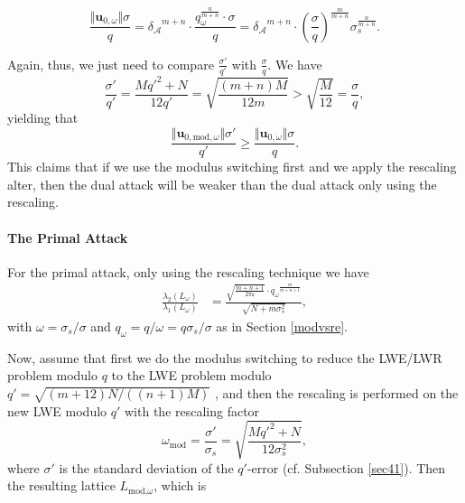 \documentclass{cta-author}
\begin{document}
$$\frac{\Vert \mathbf{u}_{0, {\omega}}\Vert\sigma}{q}=
{\delta_{\mathcal{A}}}^{m+n}\cdot \frac{q_{\omega}^{\frac{n}{m+n}}\cdot \sigma}{q}={\delta_{\mathcal{A}}}^{m+n}\cdot \left(\frac{\sigma}{q}\right)^{\frac{m}{m+n}}\sigma_s^{\frac{n}{m+n}}.$$

Again, thus, we just need to compare $\frac{\sigma'}{q'}$ with $\frac{\sigma}{q}$. We have  $$\frac{\sigma'}{q'}=\frac{Mq'^2+N}{12q'}=\sqrt{\frac{(m+n)M}{12m}}> \sqrt{\frac{M}{12}} = \frac{\sigma}{q},$$
yielding that 
$$\frac{\Vert \mathbf{u}_{0,\text{mod}, {\omega}}\Vert\sigma'}{q'} \geq \frac{\Vert \mathbf{u}_{0, {\omega}}\Vert\sigma}{q}.$$
This claims that if we use the modulus switching first and we apply the rescaling alter, then the dual attack will be weaker than the dual attack only using the rescaling. 
\paragraph{The Primal Attack}


For the primal attack, only using the rescaling technique we have
\begin{align*}
\frac{\lambda_2(L_{\omega})}{\lambda_1(L_{\omega})}&=\frac{\sqrt{\frac{m+n+1}{2 \pi  \mathfrak{e}}}\cdot {q_{\omega}}^{\frac{m}{m+n+1}}}{\sqrt{N+m\sigma_s^2}},
\end{align*}
with $\omega=\sigma_s/\sigma$  and $q_{\omega}=q/\omega=q\sigma_s/\sigma$ as in Section \ref{modvsre}.

Now, assume that first we do the modulus switching to reduce the LWE/LWR problem modulo $q$ to the LWE problem modulo $q'=\sqrt{(m+12)N/((n+1)M)}$ , and then the rescaling is performed on the new LWE modulo $q'$ with the rescaling factor 
$$\omega_{\text{mod}}=\frac{\sigma'}{\sigma_s}=\sqrt{\frac{Mq'^2+N}{12\sigma_s^2}},$$ where $\sigma'$ is the standard deviation of the $q'$-error (cf. Subsection \ref{sec41}).  
Then the resulting lattice $L_{\text{mod,}\omega}$, which is
\end{document}
